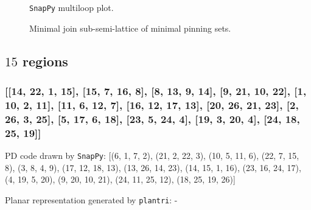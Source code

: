 \documentclass{article}%
\begin{document}
\begin{multicols}{2}
\begin{figure}[H]
\centering

\caption{\texttt{SnapPy} multiloop plot.}
\label{fig:tex/img/[[5, 24, 6, 1], [4, 9, 5, 10], [14, 23, 15, 24], [6, 15, 7, 16], [1, 21, 2, 20], [10, 20, 11, 19], [3, 18, 4, 19], [13, 8, 14, 9], [22, 7, 23, 8], [16, 22, 17, 21], [2, 12, 3, 11], [12, 17, 13, 18]].svg}
\end{figure}
\columnbreak

\begin{figure}[H]
\centering
\scalebox{0.8}{}
\caption{Minimal join sub-semi-lattice of minimal pinning sets.}
\label{fig:tex/img/[[5, 24, 6, 1], [4, 9, 5, 10], [14, 23, 15, 24], [6, 15, 7, 16], [1, 21, 2, 20], [10, 20, 11, 19], [3, 18, 4, 19], [13, 8, 14, 9], [22, 7, 23, 8], [16, 22, 17, 21], [2, 12, 3, 11], [12, 17, 13, 18]].pgf}
\end{figure}
\end{multicols}

\newpage

\subsection{$15$ regions}

\subsubsection{[[14, 22, 1, 15], [15, 7, 16, 8], [8, 13, 9, 14], [9, 21, 10, 22], [1, 10, 2, 11], [11, 6, 12, 7], [16, 12, 17, 13], [20, 26, 21, 23], [2, 26, 3, 25], [5, 17, 6, 18], [23, 5, 24, 4], [19, 3, 20, 4], [24, 18, 25, 19]]}

{\small\noindent PD code drawn by \texttt{SnapPy}: [(6, 1, 7, 2), (21, 2, 22, 3), (10, 5, 11, 6), (22, 7, 15, 8), (3, 8, 4, 9), (17, 12, 18, 13), (13, 26, 14, 23), (14, 15, 1, 16), (23, 16, 24, 17), (4, 19, 5, 20), (9, 20, 10, 21), (24, 11, 25, 12), (18, 25, 19, 26)]}

{\small\noindent Planar representation generated by \texttt{plantri}: -}
\end{document}

